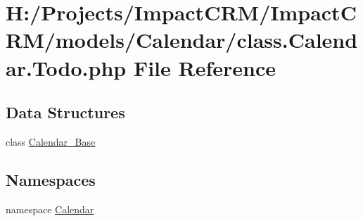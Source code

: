 \hypertarget{class_8Calendar_8Todo_8php}{
\section{H:/Projects/ImpactCRM/ImpactCRM/models/Calendar/class.Calendar.Todo.php File Reference}
\label{class_8Calendar_8Todo_8php}
}
\subsection*{Data Structures}
\begin{DoxyCompactItemize}
\item 
class \hyperlink{classCalendar__Base}{Calendar\_\-Base}
\end{DoxyCompactItemize}
\subsection*{Namespaces}
\begin{DoxyCompactItemize}
\item 
namespace \hyperlink{namespaceCalendar}{Calendar}
\end{DoxyCompactItemize}

